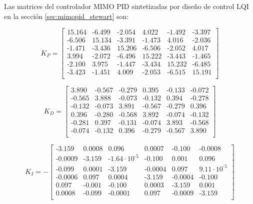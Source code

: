 Las matrices del controlador MIMO PID sintetizadas por diseño de control LQI en la sección \ref{sec:mimopid_stewart} son:

\begin{equation}
    K_P = \begin{bmatrix}
        15.164&	\textrm{-}6.499&	\textrm{-}2.054&	4.022&	\textrm{-}1.492&	\textrm{-}3.397 \\
        \textrm{-}6.506&	15.134&	\textrm{-}3.391&	\textrm{-}1.473&	4.016&	\textrm{-}2.036 \\
        \textrm{-}1.471&	\textrm{-}3.436&	15.206&	\textrm{-}6.506&	\textrm{-}2.052&	4.017 \\
        3.994&	\textrm{-}2.072&	\textrm{-}6.496&	15.222&	\textrm{-}3.443&	\textrm{-}1.465 \\
        \textrm{-}2.100&	3.975&	\textrm{-}1.447&	\textrm{-}3.434&	15.232&	\textrm{-}6.485 \\
        \textrm{-}3.423&	\textrm{-}1.451&	4.009&	\textrm{-}2.053&	\textrm{-}6.515&	15.191 \\
    \end{bmatrix}
\end{equation}

\begin{equation}
    K_D = \begin{bmatrix}
        3.890&	\textrm{-}0.567&	\textrm{-}0.279&	0.395&	\textrm{-}0.133&	\textrm{-}0.072 \\
        \textrm{-}0.565&	3.888&	\textrm{-}0.073&	\textrm{-}0.132&	0.394&	\textrm{-}0.278 \\
        \textrm{-}0.132&	\textrm{-}0.073&	3.891&	\textrm{-}0.567&	\textrm{-}0.279&	0.396 \\
        0.396&	\textrm{-}0.280&	\textrm{-}0.568&	3.892&	\textrm{-}0.074&	\textrm{-}0.132 \\
        \textrm{-}0.281&	0.397&	\textrm{-}0.131&	\textrm{-}0.074&	3.893&	\textrm{-}0.568 \\
        \textrm{-}0.074&	\textrm{-}0.132&	0.396&	\textrm{-}0.279&	\textrm{-}0.567&	3.890 \\
    \end{bmatrix}
\end{equation}

\begin{equation}
    K_I = -\begin{bmatrix}
	\textrm{-}3.159&	0.0008&	0.096&	0.0007&	\textrm{-}0.100&	\textrm{-}0.0008 \\
	\textrm{-}0.0009&	\textrm{-}3.159&	\textrm{-}1.64\cdot10^{\textrm{-}5}&	\textrm{-}0.100&	0.001& 0.096 \\
	\textrm{-}0.099&	0.0001&	\textrm{-}3.159&	\textrm{-}0.0004&	0.097&	9.11\cdot10^{\textrm{-}5} \\
	\textrm{-}0.0006&	0.097&	0.0004&	\textrm{-}3.159&	\textrm{-}0.0004&	\textrm{-}0.100 \\
	0.097&	\textrm{-}0.001&	\textrm{-}0.100&	0.0003&	\textrm{-}3.159&	0.001 \\
	0.0008&	\textrm{-}0.099&	\textrm{-}0.0001&	0.097&	\textrm{-}0.0009&	\textrm{-}3.159 \\
    \end{bmatrix}
\end{equation}

